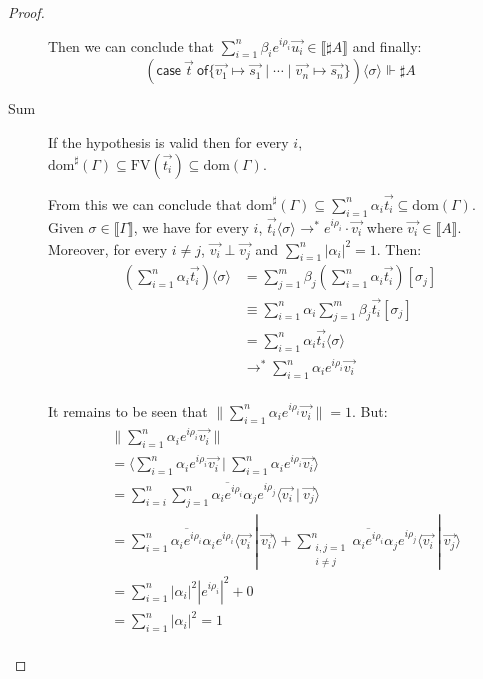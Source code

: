 \documentclass[runningheads,orivec,envcountsame,envcountsect]{llncs}
\newcommand\lra{\longrightarrow}
\newcommand\ansubst[2]{\ensuremath{\langle #1 \rangle_{#2}}}
\newcommand\dom[1]{\mathrm{dom}(#1)}
\newcommand\sdom[1]{\mathrm{dom}^{\sharp}(#1)}
\newcommand\FV[1]{\mathrm{FV}(#1)}
\def\scal#1#2{\langle{#1}~|~{#2}\rangle}
\def\gencase#1#2#3#4#5{\ensuremath{\mathsf{case}~#1~\mathsf{of} \{#2\mapsto #4 \mid \dotsb \mid #3\mapsto #5\}}}
\def\eval{\lra^*}
\def\sem#1{\llbracket#1\rrbracket}
\def\real{\Vdash}
\begin{document}
\begin{proof}
\begin{description}
    Then we can conclude that $\sum_{i=1}^{n}\beta_i e^{i\rho_i}\vec{u_i}\in\sem{\sharp A}$ and finally:
    \[
        (\gencase{\vec{t}}{\vec{v_1}}{\vec{v_n}}{\vec{s_1}}{\vec{s_n}})\ansubst{\sigma}{}\real\sharp A
    \]

    \item[Sum] If the hypothesis is valid then for every $i$, $\sdom{\Gamma}\subseteq\FV{\vec{t_i}}\subseteq\dom{\Gamma}$.
    
    From this we can conclude that $\sdom{\Gamma}\subseteq\sum_{i=1}^{n}\alpha_i \vec{t_i}\subseteq\dom{\Gamma}$. Given $\sigma\in\sem{\Gamma}$, we have for every $i$, $\vec{t_i}\ansubst{\sigma}{}\eval e^{i\rho_i}\cdot\vec{v_i}$ where $\vec{v_i}\in\sem{A}$. Moreover, for every $i\neq j$, $\vec{v_i}\perp\vec{v_j}$ and $\sum_{i=1}^{n}|\alpha_i|^2=1$. Then:
    \begin{align*}
    (\sum_{i=1}^{n}\alpha_i\vec{t_i})\ansubst{\sigma}{} 
    &= \sum_{j=1}^{m}\beta_j(\sum_{i=1}^{n}\alpha_i \vec{t_i})[\sigma_j]\\
    &\equiv \sum_{i=1}^{n} \alpha_i \sum_{j=1}^{m} \beta_j \vec{t_i}[\sigma_j]\\
    &=\sum_{i=1}^{n} \alpha_i \vec{t_i}\ansubst{\sigma}{}\\
    &\eval \sum_{i=1}^{n} \alpha_i e^{i\rho_i} \vec{v_i}\\
    \end{align*}

    It remains to be seen that $\|\sum_{i=1}^{n} \alpha_i e^{i\rho_i} \vec{v_i}\|=1$. But:
    \begin{align*}
    &\|\sum_{i=1}^{n} \alpha_i e^{i\rho_i} \vec{v_i}\| \\
    &=\scal{\sum_{i=1}^{n} \alpha_i e^{i\rho_i}\vec{v_i}}{\sum_{i=1}^{n} \alpha_i e^{i\rho_i} \vec{v_i}}\\
    &= \sum_{i=i}^{n}\sum_{j=1}^{n} \overline{\alpha_i e^{i\rho_i}}\alpha_j e^{i\rho_j} \scal{\vec{v_i}}{\vec{v_j}}\\
    &=\sum_{i=1}^{n} \overline{\alpha_i e^{i\rho_i}}\alpha_i e^{i\rho_i} \scal{\vec{v_i}}{\vec{v_i}} + \sum_{\substack{i,j=1\\i\neq j}}^{n} \overline{\alpha_i e^{i\rho_i}}\alpha_j e^{i\rho_j} \scal{\vec{v_i}}{\vec{v_j}}\\
    &=\sum_{i=1}^{n}|\alpha_i|^2 |e^{i\rho_i}|^2+ 0\\
    &=\sum_{i=1}^{n}|\alpha_i|^2 = 1\\
    \end{align*}


\end{description}
\end{proof}
\end{document}
